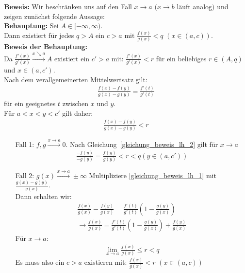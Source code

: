 \begin{Satz}
{	\textbf{Beweis:} Wir beschränken uns auf den Fall $x \rightarrow a$ 
	$(x \rightarrow b$ läuft analog$)$ und zeigen zunächst folgende Aussage: \\
	\textbf{Behauptung:} Sei $A \in [-\infty, \infty)$. \\ 
	Dann existiert für jedes $q > A$ ein $c > a$ mit $\frac{f(x)}{g(x)} < q$ $(x\in (a,c))$. \\
	\textbf{Beweis der Behauptung:} \\
	Da $\frac{f'(x)}{g'(x)} \overset{x \searrow a}{\rightarrow} A$ 
	existiert ein $c' > a$ mit: $\frac{f'(x)}{g'(x)}<r$ für ein beliebiges 
	$r \in (A,q)$ und $x \in (a,c')$.\\
	Nach dem verallgemeinerten Mittelwertsatz gilt:
	\begin{align}
		\label{gleichung_beweis_lh_1}
		\frac{f(x)-f(y)}{g(x)-g(y)} = \frac{f'(t)}{g'(t)}
	\end{align}
	für ein geeignetes $t$ zwischen $x$ und $y$. \\
	Für $a < x < y <c'$ gilt daher:
	\begin{align}
		\label{gleichung_beweis_lh_2}
		\frac{f(x)-f(y)}{g(x)-g(y)} < r
	\end{align}
	\begin{itemize}
		\item[Fall 1:] $f,g \overset{x \rightarrow a}{\rightarrow} 0$. 
		Nach Gleichung~\eqref{gleichung_beweis_lh_2}
		gilt für $x \rightarrow a$ 
		\begin{align*}
			\frac{-f(y)}{-g(y)} = \frac{f(y)}{g(y)} < r <q (y \in (a, c'))
		\end{align*}
		\item[Fall 2:] $g(x) \overset{x \rightarrow a}{\rightarrow}\pm \infty$
		Multipliziere \eqref{gleichung_beweis_lh_1} mit
		$\frac{g(x)-g(y)}{g(x)}$. \\
		Dann erhalten wir:
		\begin{align*}
			\frac{f(x)}{g(x)} - \frac{f(y)}{g(x)} = \frac{f'(t)}{g'(t)}
			\left( 1 - \frac{g(y)}{g(x)}\right) \\
			 \rightarrow \frac{f(x)}{g(x)} = \frac{f'(t)}{g'(t)} \left(
			1- \frac{g(y)}{g(x)}\right) + \frac{f(y)}{g(x)}
		\end{align*}
		Für $x \rightarrow a$:
		\begin{align*}
			\lim\limits_{x\rightarrow a}{\frac{f(x)}{g(x)}}\leq r < q
		\end{align*}
		Es muss also ein $ c > a$ existieren mit: 
		$\frac{f(x)}{g(x)} <r$ $(x \in (a,c))$ \\

\end{itemize}}
\end{Satz}
